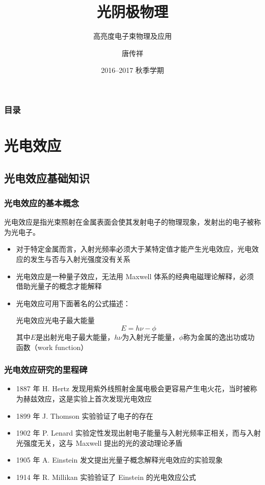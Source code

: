 \documentclass[ignorenonframetext, t]{beamer}
\title{光阴极物理}
\subtitle{高亮度电子束物理及应用}
\author{唐传祥}
\institute{清华大学工程物理系}
\date{2016--2017 秋季学期}
\begin{document}
\begin{frame}
  \titlepage
\end{frame}

\begin{frame}
  \frametitle{目录}
  \begin{multicols}{2}
  \tableofcontents
	\end{multicols}
\end{frame}

\section{光电效应}

\subsection{光电效应基础知识}

\begin{frame}
  \frametitle{光电效应的基本概念}
  \begin{concept}
  	\alert{光电效应}是指光束照射在金属表面会使其发射电子的物理现象，发射出的电子被称为\alert{光电子}。
	\end{concept}
  \begin{itemize}
	  \item 对于特定金属而言，入射光频率必须大于某特定值才能产生光电效应，光电效应的发生与否与入射光强度没有关系
	  \item 光电效应是一种量子效应，无法用 Maxwell 体系的经典电磁理论解释，必须借助\alert{光量子}的概念才能解释
	  \item 光电效应可用下面著名的公式描述：
	  \begin{formula}{光电效应光电子最大能量}
	  \[
	  E = h\nu-\phi
	  \]
	  \scriptsize{其中$E$是出射光电子最大能量，$h\nu$为入射光子能量，$\phi$称为金属的逸出功或功函数（work function）}
	  \end{formula}
  \end{itemize}
\end{frame}

\begin{frame}
  \frametitle{光电效应研究的里程碑}
  \begin{itemize}
	  \item 1887 年 H. Hertz 发现用紫外线照射金属电极会更容易产生电火花，当时被称为赫兹效应，这是实验上首次发现光电效应
	  \item 1899 年 J. Thomson 实验验证了电子的存在
	  \item 1902 年 P. Lenard 实验定性发现出射电子能量与入射光频率正相关，而与入射光强度无关，这与 Maxwell 提出的光的波动理论矛盾
		\item 1905 年 A. Einstein 发文提出光量子概念解释光电效应的实验现象
		\item 1914 年 R. Millikan 实验验证了 Einstein 的光电效应公式
  \end{itemize}
\end{frame}
\end{document}
